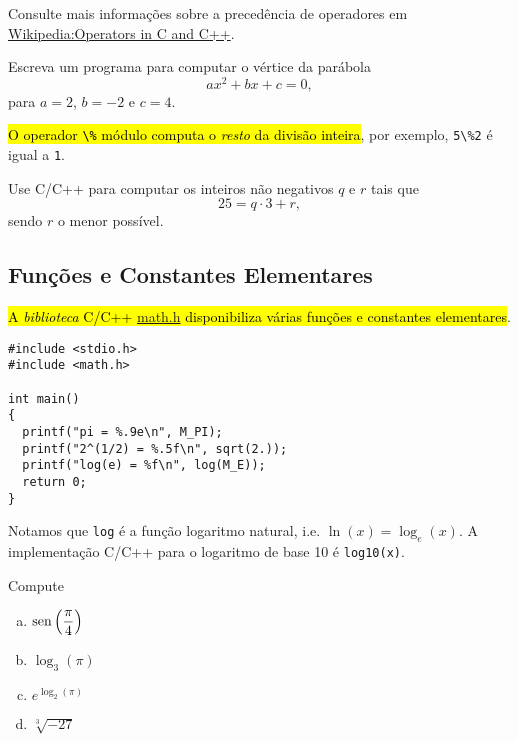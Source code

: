 \documentclass[12pt]{article}
\begin{document}
\begin{obs}
Consulte mais informações sobre a precedência de operadores em \href{https://en.wikipedia.org/wiki/Operators_in_C_and_C\%2B\%2B#Operator_precedence}{Wikipedia:Operators in C and C++}.
\end{obs}

\begin{exr}
  Escreva um programa para computar o vértice da parábola
  \begin{equation}
    ax^2 + bx + c = 0,
  \end{equation}
  para $a = 2$, $b = -2$ e $c = 4$. 
\end{exr}

\hl{O operador {\lstinline+\%+} módulo computa o \emph{resto} da divisão inteira}, por exemplo, \lstinline+5\%2+ é igual a \lstinline+1+.

\begin{exr}
  Use C/C++ para computar os inteiros não negativos $q$ e $r$ tais que
  \begin{equation}
    25 = q\cdot 3 + r,
  \end{equation}
  sendo $r$ o menor possível.
\end{exr}

\subsection{Funções e Constantes Elementares}

\hl{A \emph{biblioteca} C/C++ {\href{https://cplusplus.com/reference/cmath}{math.h}} disponibiliza várias funções e constantes elementares}.
\begin{lstlisting}[caption=mat.cc]
#include <stdio.h>
#include <math.h>

int main()
{
  printf("pi = %.9e\n", M_PI);
  printf("2^(1/2) = %.5f\n", sqrt(2.));
  printf("log(e) = %f\n", log(M_E));
  return 0;
}
\end{lstlisting}

\begin{obs}
  Notamos que \lstinline+log+ é a função logaritmo natural, i.e. $\ln(x) = \log_e(x)$. A implementação C/C++ para o logaritmo de base 10 é \lstinline!log10(x)!.
\end{obs}

\begin{exr}
  Compute
  \begin{enumerate}[a)]
  \item $\displaystyle \operatorname{sen}\left(\frac{\pi}{4}\right)$
  \item $\displaystyle \log_3(\pi)$
  \item $\displaystyle e^{\log_2(\pi)}$
  \item $\displaystyle \sqrt[3]{-27}$
  \end{enumerate}
\end{exr}
\end{document}
